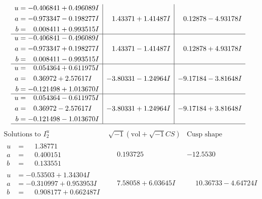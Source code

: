 \documentclass[1p]{elsarticle_modified}
\theoremstyle{definition}
\newcommand{\I}{\sqrt{-1}}
\begin{document}
$$\begin{array}{c|c|c}
\begin{aligned}
u &= -0.406841 + 0.496089 I \\
a &= -0.973347 - 0.198277 I \\
b &= \phantom{-}0.008411 + 0.993515 I\end{aligned}
 & \phantom{-}1.43371 + 1.41487 I & \phantom{-}0.12878 - 4.93178 I \\ \hline\begin{aligned}
u &= -0.406841 - 0.496089 I \\
a &= -0.973347 + 0.198277 I \\
b &= \phantom{-}0.008411 - 0.993515 I\end{aligned}
 & \phantom{-}1.43371 - 1.41487 I & \phantom{-}0.12878 + 4.93178 I \\ \hline\begin{aligned}
u &= \phantom{-}0.054364 + 0.611975 I \\
a &= \phantom{-}0.36972 + 2.57617 I \\
b &= -0.121498 + 1.013670 I\end{aligned}
 & -3.80331 - 1.24964 I & -9.17184 - 3.81648 I \\ \hline\begin{aligned}
u &= \phantom{-}0.054364 - 0.611975 I \\
a &= \phantom{-}0.36972 - 2.57617 I \\
b &= -0.121498 - 1.013670 I\end{aligned}
 & -3.80331 + 1.24964 I & -9.17184 + 3.81648 I\\
 \hline 
 \end{array}$$\newpage$$\begin{array}{c|c|c}  
\text{Solutions to }I^u_{2}& \I (\text{vol} + \sqrt{-1}CS) & \text{Cusp shape}\\
 \hline 
\begin{aligned}
u &= \phantom{-}1.38771\phantom{ +0.000000I} \\
a &= \phantom{-}0.400151\phantom{ +0.000000I} \\
b &= \phantom{-}0.133551\phantom{ +0.000000I}\end{aligned}
 & \phantom{-}0.193725\phantom{ +0.000000I} & -12.5530\phantom{ +0.000000I} \\ \hline\begin{aligned}
u &= -0.53503 + 1.34304 I \\
a &= -0.310997 + 0.953953 I \\
b &= \phantom{-}0.908177 + 0.662487 I\end{aligned}
 & \phantom{-}7.58058 + 6.03645 I & \phantom{-}10.36733 - 4.64724 I \\ \hline\begin{aligned}

\end{aligned}
\end{array}$$
\end{document}
